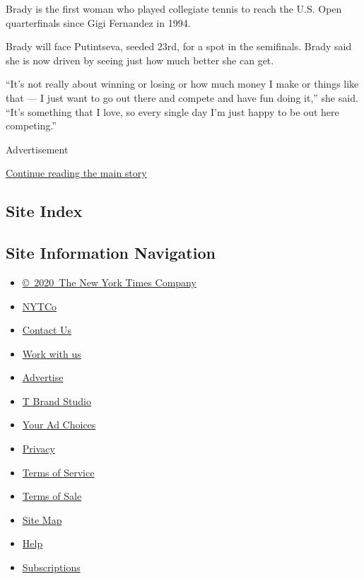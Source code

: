 Brady is the first woman who played collegiate tennis to reach the U.S.
Open quarterfinals since Gigi Fernandez in 1994.

Brady will face Putintseva, seeded 23rd, for a spot in the semifinals.
Brady said she is now driven by seeing just how much better she can get.

``It's not really about winning or losing or how much money I make or
things like that --- I just want to go out there and compete and have
fun doing it,'' she said. ``It's something that I love, so every single
day I'm just happy to be out here competing.''

Advertisement

\protect\hyperlink{after-bottom}{Continue reading the main story}

\hypertarget{site-index}{%
\subsection{Site Index}\label{site-index}}

\hypertarget{site-information-navigation}{%
\subsection{Site Information
Navigation}\label{site-information-navigation}}

\begin{itemize}
\tightlist
\item
  \href{https://help.nytimes3xbfgragh.onion/hc/en-us/articles/115014792127-Copyright-notice}{©~2020~The
  New York Times Company}
\end{itemize}

\begin{itemize}
\tightlist
\item
  \href{https://www.nytco.com/}{NYTCo}
\item
  \href{https://help.nytimes3xbfgragh.onion/hc/en-us/articles/115015385887-Contact-Us}{Contact
  Us}
\item
  \href{https://www.nytco.com/careers/}{Work with us}
\item
  \href{https://nytmediakit.com/}{Advertise}
\item
  \href{http://www.tbrandstudio.com/}{T Brand Studio}
\item
  \href{https://www.nytimes3xbfgragh.onion/privacy/cookie-policy\#how-do-i-manage-trackers}{Your
  Ad Choices}
\item
  \href{https://www.nytimes3xbfgragh.onion/privacy}{Privacy}
\item
  \href{https://help.nytimes3xbfgragh.onion/hc/en-us/articles/115014893428-Terms-of-service}{Terms
  of Service}
\item
  \href{https://help.nytimes3xbfgragh.onion/hc/en-us/articles/115014893968-Terms-of-sale}{Terms
  of Sale}
\item
  \href{https://spiderbites.nytimes3xbfgragh.onion}{Site Map}
\item
  \href{https://help.nytimes3xbfgragh.onion/hc/en-us}{Help}
\item
  \href{https://www.nytimes3xbfgragh.onion/subscription?campaignId=37WXW}{Subscriptions}
\end{itemize}
